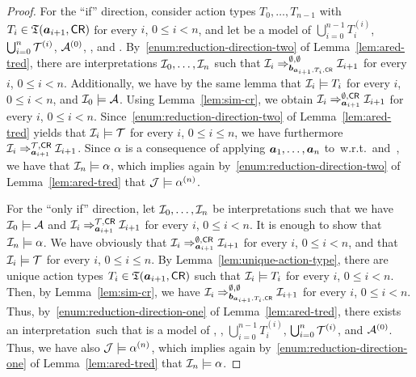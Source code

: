 \begin{proof}
    For the \enquote{if} direction, consider action types $T_0,\dots,T_{n-1}$
    with $T_i\in\mathfrak{T}(\boldsymbol a_{i+1},\mathsf{CR})$ for every $i$, $0\le i<n$, and let \Jmc be
    a model of $\bigcup_{i=0}^{n-1}T_i^{(i)}$, $\bigcup_{i=0}^n\mathcal{T}^{(i)}$,
    $\mathcal{A}^{(0)}$, \Ared, and \Tred.
    By~\eqref{enum:reduction-direction-two} of Lemma~\ref{lem:ared-tred}, there
    are interpretations $\mathcal{I}_0,\dots,\mathcal{I}_n$ such that
    $\mathcal{I}_i\Rightarrow_{\boldsymbol b_{\boldsymbol a_{i+1},T_i,\mathsf{CR}}}^{\emptyset,\emptyset}\mathcal{I}_{i+1}$
    for every $i$, $0\le i<n$.  Additionally, we have by the same lemma that
    $\mathcal{I}_i\models T_i$ for every $i$, $0\le i<n$, and $\mathcal{I}_0\models\mathcal{A}$.
    Using Lemma~\ref{lem:sim-cr}, we obtain
    $\mathcal{I}_i\Rightarrow_{\boldsymbol a_{i+1}}^{\emptyset,\mathsf{CR}}\mathcal{I}_{i+1}$ for every $i$,
    $0\le i<n$.  Since~\eqref{enum:reduction-direction-two} of
    Lemma~\ref{lem:ared-tred} yields that $\mathcal{I}_i\models\mathcal{T}$ for every $i$,
    $0\le i\le n$, we have furthermore
    $\mathcal{I}_i\Rightarrow_{\boldsymbol a_{i+1}}^{\mathcal{T},\mathsf{CR}}\mathcal{I}_{i+1}$.  Since $\alpha$ is a
    consequence of applying $\boldsymbol a_1,\dots,\boldsymbol a_n$ to~\Amc w.r.t.~\Tmc and~\CR,
    we have that $\mathcal{I}_n\models\alpha$, which implies again
    by~\eqref{enum:reduction-direction-two} of Lemma~\ref{lem:ared-tred} that
    $\mathcal{J}\models\alpha^{(n)}$.

    For the \enquote{only if} direction, let $\mathcal{I}_0,\dots,\mathcal{I}_n$ be
    interpretations such that we have $\mathcal{I}_0\models\mathcal{A}$ and
    $\mathcal{I}_i\Rightarrow_{\boldsymbol a_{i+1}}^{\mathcal{T},\mathsf{CR}}\mathcal{I}_{i+1}$ for every $i$, $0\le
    i<n$.  It is enough to show that $\mathcal{I}_n\models\alpha$.  We have obviously
    that $\mathcal{I}_i\Rightarrow_{\boldsymbol a_{i+1}}^{\emptyset,\mathsf{CR}}\mathcal{I}_{i+1}$ for every
    $i$, $0\le i<n$, and that $\mathcal{I}_i\models\mathcal{T}$ for every $i$, $0\le i\le n$.
    By Lemma~\ref{lem:unique-action-type}, there are unique action types
    $T_i\in\mathfrak{T}(\boldsymbol a_{i+1},\mathsf{CR})$ such that $\mathcal{I}_i\models T_i$ for every $i$,
    $0\le i<n$.  Then, by Lemma~\ref{lem:sim-cr}, we have
    $\mathcal{I}_i\Rightarrow_{\boldsymbol b_{\boldsymbol a_{i+1},T_i,\mathsf{CR}}}^{\emptyset,\emptyset}\mathcal{I}_{i+1}$
    for every $i$, $0\le i<n$.  Thus, by~\eqref{enum:reduction-direction-one} of
    Lemma~\ref{lem:ared-tred}, there exists an interpretation~\Jmc such that
    \Jmc is a model of \Ared, \Tred, $\bigcup_{i=0}^{n-1}T_i^{(i)}$,
    $\bigcup_{i=0}^n\mathcal{T}^{(i)}$, and $\mathcal{A}^{(0)}$.  Thus, we have also
    $\mathcal{J}\models\alpha^{(n)}$, which implies again
    by~\eqref{enum:reduction-direction-one} of Lemma~\ref{lem:ared-tred} that
    $\mathcal{I}_n\models\alpha$.
\end{proof}

